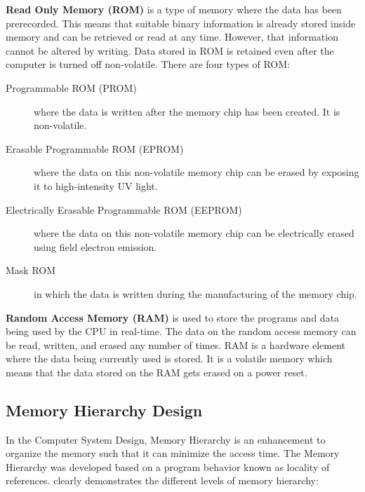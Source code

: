 \textbf{Read Only Memory (ROM)} is a type of memory where the data has been prerecorded. This means that suitable binary information is already stored inside memory and can be retrieved or read at any time. However, that information cannot be altered by writing. Data stored in ROM is retained even after the computer is turned off \ie non-volatile. There are four types of ROM:
\begin{description}
    \item[Programmable ROM (PROM)] where the data is written after the memory chip has been created. It is non-volatile.
    \item[Erasable Programmable ROM (EPROM)] where the data on this non-volatile memory chip can be erased by exposing it to high-intensity UV light.
    \item[Electrically Erasable Programmable ROM (EEPROM)] where the data on this non-volatile memory chip can be electrically erased using field electron emission.
    \item[Mask ROM] in which the data is written during the manufacturing of the memory chip.
\end{description}

\par \textbf{Random Access Memory (RAM)} is used to store the programs and data being used by the CPU in real-time. The data on the random access memory can be read, written, and erased any number of times. RAM is a hardware element where the data being currently used is stored. It is a volatile memory which means that the data stored on the RAM gets erased on a power reset. 

\subsection{Memory Hierarchy Design}
In the Computer System Design, Memory Hierarchy is an enhancement to organize the memory such that it can minimize the access time. The Memory Hierarchy was developed based on a program behavior known as locality of references.  clearly demonstrates the different levels of memory hierarchy:

